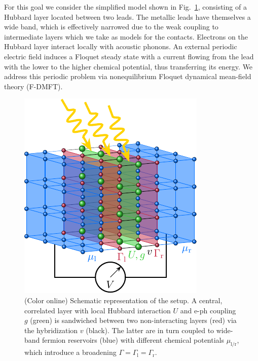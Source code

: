 \documentclass[aps,prb,groupedaddress,showpacs,twocolumn,superscriptaddress,10pt]{revtex4-2}
\begin{document}
For this goal we consider the simplified model shown in Fig.~\ref{fig:setup}, consisting of a Hubbard layer located between two leads. The metallic leads have themselves a wide band, which is effectively narrowed due to the weak coupling to intermediate layers which we take as models for the contacts. Electrons on the Hubbard layer interact locally with acoustic phonons. An external periodic electric field induces a Floquet steady state with a current flowing from the lead with the lower to the higher chemical potential, thus transferring its energy.
 We address this periodic problem
 via nonequilibrium Floquet dynamical mean-field theory (F-DMFT).
 
  
\begin{figure}[b] 
\includegraphics[width=0.9\linewidth]{./figures_Paper1/setup_voltmeter.pdf}
\caption{(Color online) Schematic representation of the setup. A central, correlated layer with local Hubbard interaction $U$ and e-ph coupling $g$ (green) is sandwiched between two non-interacting layers (red) via the hybridization $v$ (black). The latter are in turn coupled to wide-band fermion reservoirs (blue) with different chemical potentials $\mu_{\text{l}/\text{r}}$, which introduce a broadening $\Gamma=\Gamma_{\text{l}}=\Gamma_{\text{r}}$.}
\label{fig:setup}
\end{figure}   
    
\end{document}
